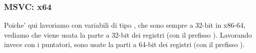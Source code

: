 \subsubsection{MSVC: x64}


Poiche' qui lavoriamo con variabili di tipo \Tint{}, che sono sempre a 32-bit in x86-64, vediamo che viene usata la parte a 32-bit dei registri (con il prefisso ).
Lavorando invece con i puntatori, sono usate la parti a 64-bit dei registri (con il prefisso ).



